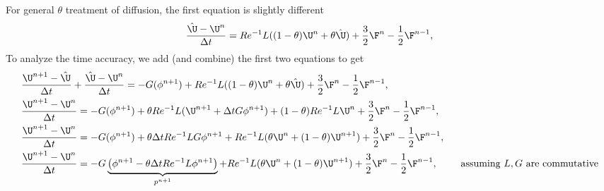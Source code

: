 \documentclass[landscape]{article}
\newcommand{\ReInv}{Re^{-1}}
\begin{document}
For general $\theta$ treatment of diffusion, the first equation is slightly different
\begin{equation}\begin{aligned}
\frac{\hat{\U}-\U^n}{\Delta t} = \ReInv L((1-\theta)\U^n+\theta\hat{\U}) + \frac{3}{2}\F^n - \frac{1}{2}\F^{n-1}, \\
\end{aligned} \end{equation}
To analyze the time accuracy, we add (and combine) the first two equations to get
\begin{equation}\begin{aligned}
& \frac{\U^{n+1}-\hat{\U}}{\Delta t} + \frac{\hat{\U}-\U^n}{\Delta t} = - G (\phi^{n+1}) + \ReInv L((1-\theta)\U^n+\theta\hat{\U}) + \frac{3}{2}\F^n - \frac{1}{2}\F^{n-1}, \\
& \frac{\U^{n+1}-\U^n}{\Delta t} = - G (\phi^{n+1}) + \theta \ReInv L(\U^{n+1}+ \Delta t G\phi^{n+1}) + (1-\theta) \ReInv L\U^n + \frac{3}{2}\F^n - \frac{1}{2}\F^{n-1}, \\
& \frac{\U^{n+1}-\U^n}{\Delta t} = - G (\phi^{n+1}) + \theta \Delta t \ReInv L G\phi^{n+1} + \ReInv L(\theta\U^n+(1-\theta)\U^{n+1}) + \frac{3}{2}\F^n - \frac{1}{2}\F^{n-1}, \\
& \frac{\U^{n+1}-\U^n}{\Delta t} = - G \underbrace{\left(\phi^{n+1} - \theta \Delta t \ReInv L \phi^{n+1} \right)}_{p^{n+1}} + \ReInv L(\theta\U^n+(1-\theta)\U^{n+1}) + \frac{3}{2}\F^n - \frac{1}{2}\F^{n-1}, \qquad \text{ assuming $L,G$ are commutative} \\
\end{aligned} \end{equation}


\newpage
\end{document}
